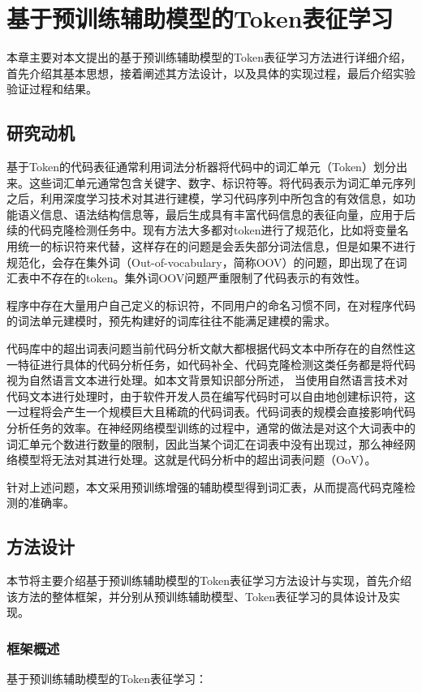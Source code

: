 \chapter{基于预训练辅助模型的Token表征学习}
\label{chap:Token}
本章主要对本文提出的基于预训练辅助模型的Token表征学习方法进行详细介绍，首先介绍其基本思想，接着阐述其方法设计，以及具体的实现过程，最后介绍实验验证过程和结果。

\section{研究动机}
\label{sec:Motivation}

基于Token的代码表征通常利用词法分析器将代码中的词汇单元（Token）划分出来。这些词汇单元通常包含关键字、数字、标识符等。将代码表示为词汇单元序列之后，利用深度学习技术对其进行建模，学习代码序列中所包含的有效信息，如功能语义信息、语法结构信息等，最后生成具有丰富代码信息的表征向量，应用于后续的代码克隆检测任务中。现有方法大多都对token进行了规范化，比如将变量名用统一的标识符来代替，这样存在的问题是会丢失部分词法信息，但是如果不进行规范化，会存在集外词（Out-of-vocabulary，简称OOV）的问题，即出现了在词汇表中不存在的token。集外词OOV问题严重限制了代码表示的有效性。

程序中存在大量用户自己定义的标识符，不同用户的命名习惯不同，在对程序代码的词法单元建模时，预先构建好的词库往往不能满足建模的需求。

代码库中的超出词表问题当前代码分析文献大都根据代码文本中所存在的自然性这一特征进行具体的代码分析任务，如代码补全、代码克隆检测这类任务都是将代码视为自然语言文本进行处理。如本文背景知识部分所述，
当使用自然语言技术对代码文本进行处理时，由于软件开发人员在编写代码时可以自由地创建标识符，这一过程将会产生一个规模巨大且稀疏的代码词表。代码词表的规模会直接影响代码分析任务的效率。在神经网络模型训练的过程中，通常的做法是对这个大词表中的词汇单元个数进行数量的限制，因此当某个词汇在词表中没有出现过，那么神经网络模型将无法对其进行处理。这就是代码分析中的超出词表问题（OoV）。

针对上述问题，本文采用预训练增强的辅助模型得到词汇表，从而提高代码克隆检测的准确率。

\section{方法设计}
\label{sec:}
本节将主要介绍基于预训练辅助模型的Token表征学习方法设计与实现，首先介绍该方法的整体框架，并分别从预训练辅助模型、Token表征学习的具体设计及实现。

\subsection{框架概述}
\label{subsec:Overview}
基于预训练辅助模型的Token表征学习：

